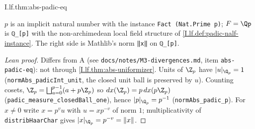 \begin{theorem}
\end{theorem}
\begin{tfformal}{I.lf.thm:abs-padic-eq}
\begin{tffidelity}
$p$ is an implicit natural number with the instance \texttt{Fact (Nat.Prime p)}; $F=\Qp$ is \texttt{ℚ\_[p]} with the non-archimedean local field structure of \cref{I.lf.def:padic-nalf-instance}. The right side is Mathlib's norm \texttt{‖x‖} on \texttt{ℚ\_[p]}.
\end{tffidelity}
\end{tfformal}
\begin{proof}[Lean proof]
Differs from A (see \texttt{docs/notes/M3-divergences.md}, item \texttt{abs-padic-eq}): not through \cref{I.lf.thm:abs-uniformizer}. Units of $\Z_p$ have $|u|_{\Q_p}=1$ (\texttt{normAbs\_padicInt\_unit}, the closed unit ball is preserved by $u$). Counting cosets, $\Z_p=\bigsqcup_{a=0}^{p-1}(a+p\Z_p)$ so $dx(\Z_p)=p\,dx(p\Z_p)$ (\texttt{padic\_measure\_closedBall\_one}), hence $|p|_{\Q_p}=p^{-1}$ (\texttt{normAbs\_padic\_p}). For $x\ne0$ write $x=p^{v}u$ with $u=xp^{-v}$ of norm $1$; multiplicativity of \texttt{distribHaarChar} gives $|x|_{\Q_p}=p^{-v}=\|x\|$.
\end{proof}

